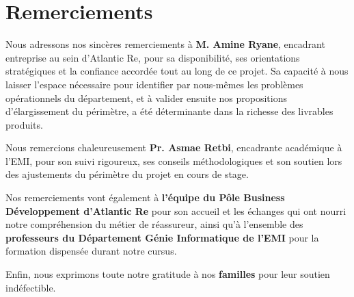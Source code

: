 \documentclass[../main.tex]{subfiles}
\begin{document}
\chapter*{Remerciements}

Nous adressons nos sincères remerciements à \textbf{M. Amine Ryane}, encadrant
entreprise au sein d'Atlantic Re, pour sa disponibilité, ses orientations stratégiques
et la confiance accordée tout au long de ce projet. Sa capacité à nous laisser
l'espace nécessaire pour identifier par nous-mêmes les problèmes opérationnels du
département, et à valider ensuite nos propositions d'élargissement du périmètre, a
été déterminante dans la richesse des livrables produits.

Nous remercions chaleureusement \textbf{Pr. Asmae Retbi}, encadrante académique à
l'EMI, pour son suivi rigoureux, ses conseils méthodologiques et son soutien lors des
ajustements du périmètre du projet en cours de stage.

Nos remerciements vont également à \textbf{l'équipe du Pôle Business Développement
d'Atlantic Re} pour son accueil et les échanges qui ont nourri notre compréhension
du métier de réassureur, ainsi qu'à l'ensemble des \textbf{professeurs du Département
Génie Informatique de l'EMI} pour la formation dispensée durant notre cursus.

Enfin, nous exprimons toute notre gratitude à nos \textbf{familles} pour leur
soutien indéfectible.

\clearpage

\end{document}
